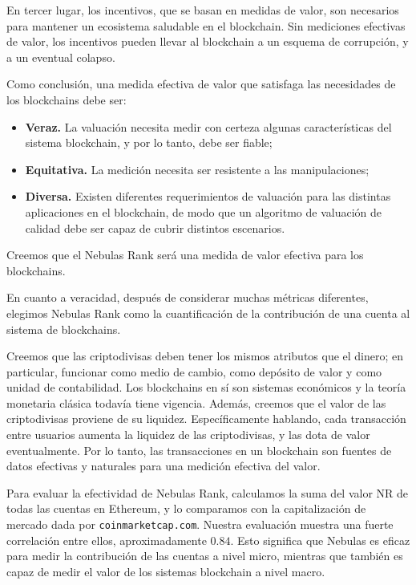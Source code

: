 En tercer lugar, los incentivos, que se basan en medidas de valor, son necesarios para mantener un ecosistema saludable en el blockchain. Sin mediciones efectivas de valor, los incentivos pueden llevar al blockchain a un esquema de corrupción, y a un eventual colapso.

Como conclusión, una medida efectiva de valor que satisfaga las necesidades de los blockchains debe ser:
\begin{itemize}
\item{\textbf{Veraz.}} La valuación necesita medir con certeza algunas características del sistema blockchain, y por lo tanto, debe ser fiable;
\item{\textbf{Equitativa.}} La medición necesita ser resistente a las manipulaciones;
\item{\textbf{Diversa.}} Existen diferentes requerimientos de valuación para las distintas aplicaciones en el blockchain, de modo que un algoritmo de valuación de calidad debe ser capaz de cubrir distintos escenarios.
\end{itemize}

Creemos que el Nebulas Rank será una medida de valor efectiva para los blockchains.

En cuanto a veracidad, después de considerar muchas métricas diferentes, elegimos Nebulas Rank como la cuantificación de la contribución de una cuenta al sistema de blockchains.

Creemos que las criptodivisas deben tener los mismos atributos que el dinero; en particular, funcionar como medio de cambio, como depósito de valor y como unidad de contabilidad. Los blockchains en sí son sistemas económicos y la teoría monetaria clásica todavía tiene vigencia. Además, creemos que el valor de las criptodivisas proviene de su liquidez. Específicamente hablando, cada transacción entre usuarios aumenta la liquidez de las criptodivisas, y las dota de valor eventualmente. Por lo tanto, las transacciones en un blockchain son fuentes de datos efectivas y naturales para una medición efectiva del valor.

Para evaluar la efectividad de Nebulas Rank, calculamos la suma del valor NR de todas las cuentas en Ethereum, y lo comparamos con la capitalización de mercado dada por \texttt{coinmarketcap.com}. Nuestra evaluación muestra una fuerte correlación entre ellos, aproximadamente $0.84$. Esto significa que Nebulas es eficaz para medir la contribución de las cuentas a nivel micro, mientras que también es capaz de medir el valor de los sistemas blockchain a nivel macro.

